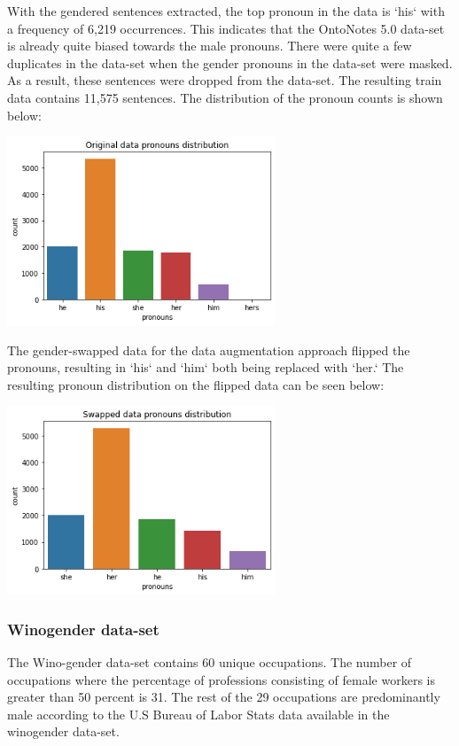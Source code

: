\documentclass[10pt]{article}
\begin{document}
With the gendered sentences extracted, the top pronoun in the data is `his` with a frequency of 6,219 occurrences. This indicates that the OntoNotes 5.0 data-set is already quite biased towards the male pronouns. There were quite a few duplicates in the data-set when
the gender pronouns in the data-set were masked. As a result, these sentences were dropped from the data-set. The resulting train data contains 11,575 sentences. The distribution of the pronoun counts is shown below:

\includegraphics[width=8cm,scale=1.0]{final-report-images/eda1.png} \label{perf}

The gender-swapped data for the data augmentation approach flipped the pronouns, resulting in `his` and `him` both being replaced with `her.` The resulting pronoun distribution on the flipped data can be seen below:

\includegraphics[width=8cm,scale=1.0]{final-report-images/eda2.png} \label{perf}

\subsubsection{Winogender data-set}
The Wino-gender data-set contains 60 unique occupations. The number of occupations where the percentage of professions consisting of
female workers is greater than 50 percent is 31. The rest of the 29 occupations are predominantly male according to the U.S Bureau of Labor Stats data available in the winogender data-set.
\end{document}

